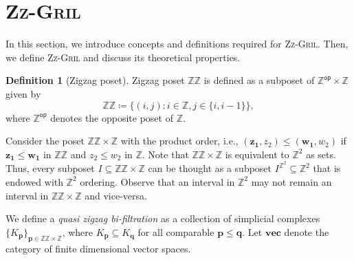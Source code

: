 \documentclass{article}
\newcommand{\zzgril}{\textsc{Zz-Gril}}
\newcommand{\qzzmod}{quasi zigzag persistence module}
\newcommand{\RKG}{\mathsf{rk}}
\newcommand{\RR}{\mathbb{R}}
\newcommand{\zz}{\mathbb{ZZ}}
\newcommand{\z}{\mathbb{Z}}
\theoremstyle{plain}
\theoremstyle{definition}
\newtheorem{definition}[theorem]{Definition}
\theoremstyle{remark}
\newtheorem{remark}[theorem]{Remark}
\begin{document}
 










\section{\zzgril}\label{sec:zzgril}
In this section, we introduce concepts and definitions required for \zzgril. Then, we define \zzgril{} and discuss its theoretical properties. 

\begin{definition}[Zigzag poset]
    Zigzag poset $\zz$ is defined as a subposet of $\z^{\mathsf{op}} \times \z$ given by 
    \begin{equation*}
        \zz \coloneqq \{ (i,j) \colon i \in \z , j \in \{i, i-1\} \},
    \end{equation*}
    where $\z^{\mathsf{op}}$ denotes the opposite poset of $\z$.
    \label{def:zzposet}
\end{definition}


Consider the poset $\zz \times \z$ with the product order, i.e., $(\mathbf{z_1}, z_2) \leq (\mathbf{w_1}, w_2)$ if $\mathbf{z_1} \leq \mathbf{w_1}$ in $\zz$ and $z_2 \leq w_2$ in $\z$. Note that $\zz \times \z$ is equivalent to $\z^2$ as sets. Thus, every subposet $I\subseteq \zz\times \z$ can be thought as a subposet $I^{\z^2}\subseteq \z^2$ that
is endowed with $\z^2$ ordering. Observe that an interval in
$\z^2$ may not remain an interval in $\zz\times \z$ and vice-versa. 

We define a \emph{quasi zigzag bi-filtration} as a collection of simplicial complexes $\{K_{\mathbf{p}}\}_{\mathbf{p} \in \zz \times \z}$, where $K_{\mathbf{p}} \subseteq K_{\mathbf{q}}$ for all comparable $\mathbf{p} \leq \mathbf{q}$. Let $\mathbf{vec}$ denote
the category of finite dimensional vector spaces.
\end{document}

